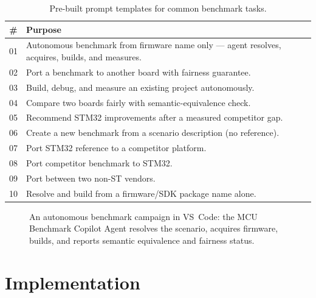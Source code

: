 \begin{table}[H]
\centering
\caption{Pre-built prompt templates for common benchmark tasks.}
\label{tab:agent-prompts}
\begin{tabularx}{\textwidth}{c X}
\toprule
\textbf{\#} & \textbf{Purpose} \\
\midrule
01 & Autonomous benchmark from firmware name only --- agent resolves, acquires, builds, and measures. \\
02 & Port a benchmark to another board with fairness guarantee. \\
03 & Build, debug, and measure an existing project autonomously. \\
04 & Compare two boards fairly with semantic-equivalence check. \\
05 & Recommend STM32 improvements after a measured competitor gap. \\
06 & Create a new benchmark from a scenario description (no reference). \\
07 & Port STM32 reference to a competitor platform. \\
08 & Port competitor benchmark to STM32. \\
09 & Port between two non-ST vendors. \\
10 & Resolve and build from a firmware/SDK package name alone. \\
\bottomrule
\end{tabularx}
\end{table}

\begin{figure}[H]
\centering
{}
\caption{An autonomous benchmark campaign in VS~Code: the MCU Benchmark Copilot Agent resolves the scenario, acquires firmware, builds, and reports semantic equivalence and fairness status.}
\label{fig:agent-session}
\end{figure}

\section{Implementation}
\label{sec:agent-implementation}

